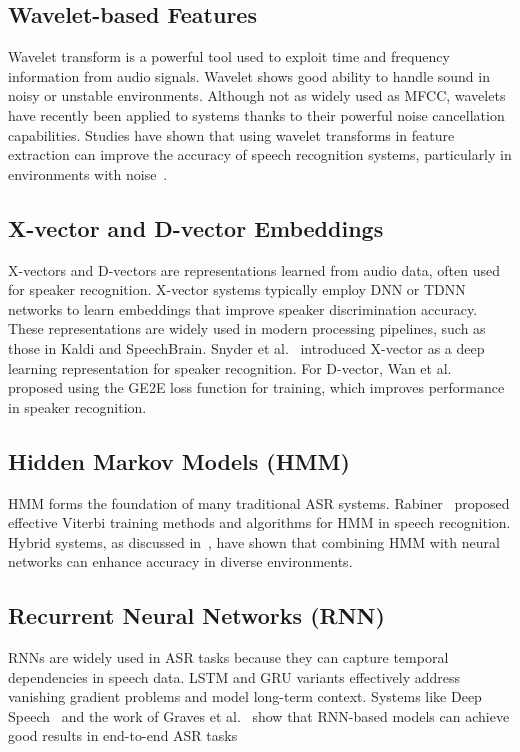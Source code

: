 \documentclass[conference]{IEEEtran}
\begin{document}
\subsection{Wavelet-based Features}

Wavelet transform is a powerful tool used to exploit time and frequency information from audio signals. Wavelet shows good ability to handle sound in noisy or unstable environments. Although not as widely used as MFCC, wavelets have recently been applied to systems thanks to their powerful noise cancellation capabilities. Studies have shown that using wavelet transforms in feature extraction can improve the accuracy of speech recognition systems, particularly in environments with noise~\cite{gupta2003robust, wang2008robust}.

\subsection{X-vector and D-vector Embeddings}

X-vectors and D-vectors are representations learned from audio data, often used for speaker recognition. X-vector systems typically employ DNN or TDNN networks to learn embeddings that improve speaker discrimination accuracy. These representations are widely used in modern processing pipelines, such as those in Kaldi and SpeechBrain. Snyder et al.~\cite{Snyder2018Xvectors} introduced X-vector as a deep learning representation for speaker recognition. For D-vector, Wan et al.~\cite{Wan2018Generalized} proposed using the GE2E loss function for training, which improves performance in speaker recognition.

\subsection{Hidden Markov Models (HMM)}

HMM forms the foundation of many traditional ASR systems. Rabiner~\cite{rabiner1989tutorial} proposed effective Viterbi training methods and algorithms for HMM in speech recognition. Hybrid systems, as discussed in~\cite{voll2007hybrid, perero2022comparison}, have shown that combining HMM with neural networks can enhance accuracy in diverse environments.

\subsection{Recurrent Neural Networks (RNN)}

RNNs are widely used in ASR tasks because they can capture temporal dependencies in speech data. LSTM and GRU variants effectively address vanishing gradient problems and model long-term context. Systems like Deep Speech~\cite{hannun2014deep} and the work of Graves et al.~\cite{graves2013speech} show that RNN-based models can achieve good results in end-to-end ASR tasks
\end{document}
